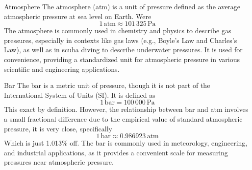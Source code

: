 \documentclass{article}
\begin{document}
\begin{briefillus}{Atmosphere}{}
	The atmosphere (atm) is a unit of pressure defined as the average atmospheric pressure at sea level on Earth. Were \[1\,\text{atm}\approx101\, 325\,\text{Pa}\]
	The atmosphere is commonly used in chemistry and physics to describe gas pressures, especially in contexts like gas laws (e.g., Boyle's Law and Charles's Law), as well as in scuba diving to describe underwater pressures. It is used for convenience, providing a standardized unit for atmospheric pressure in various scientific and engineering applications.
\end{briefillus}

\begin{briefillus}{Bar}{}
	The bar is a metric unit of pressure, though it is not part of the International System of Units (SI). It is defined as \[1\,\text{bar}=100\, 000\,\text{Pa}\] 
	This exact by definition. However, the relationship between bar and atm involves a small fractional difference due to the empirical value of standard atmospheric pressure, it is very close, specifically $$1\,\text{bar}\approx0.986923\,\text{atm}$$ Which is just 1.013\% off. The bar is commonly used in meteorology, engineering, and industrial applications, as it provides a convenient scale for measuring pressures near atmospheric pressure.
\end{briefillus}
\end{document}
